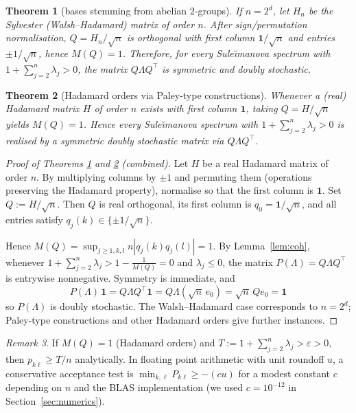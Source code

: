 \documentclass[12pt,fleqn]{amsart}
\renewcommand{\le}{\leqslant}
\renewcommand{\ge}{\geqslant}
\newtheorem{thm}{Theorem}
\theoremstyle{remark}
\newtheorem{rem}[thm]{Remark}
\newcommand{\1}{\mathbf{1}}
\newcommand{\Lam}{\Lambda}
\begin{document}
\begin{thm}[bases stemming from abelian $2$-groups]\label{thm:hypercube}
If $n=2^d$, let $H_n$ be the Sylvester (Walsh--Hadamard) matrix of order $n$. After sign/permutation normalisation, $Q=H_n/\sqrt n$ is orthogonal with first column $\1/\sqrt n$ and entries $\pm 1/\sqrt n$, hence $M(Q)=1$. Therefore, for \emph{every} Sule\u{\i}manova spectrum with $1+\sum_{j=2}^n\lambda_j>0$, the matrix $Q\Lam Q^\top$ is symmetric and doubly stochastic.
\end{thm}

\begin{thm}[Hadamard orders via Paley-type constructions]\label{thm:hadamard}
Whenever a (real) Hadamard matrix $H$ of order $n$ exists with first column $\1$, taking $Q=H/\sqrt n$ yields $M(Q)=1$. Hence every Sule\u{\i}manova spectrum with $1+\sum_{j=2}^n\lambda_j>0$ is realised by a symmetric doubly stochastic matrix via $Q\Lam Q^\top$.
\end{thm}

\begin{proof}[Proof of Theorems \ref{thm:hypercube} and \ref{thm:hadamard} (combined)]
Let $H$ be a real Hadamard matrix of order $n$. By multiplying columns by $\pm1$ and permuting them (operations preserving the Hadamard property), normalise so that the first column is $\1$. Set $Q:=H/\sqrt n$. Then $Q$ is real orthogonal, its first column is $q_0=\1/\sqrt n$, and all entries satisfy $q_j(k)\in\{\pm 1/\sqrt n\}$.

Hence $M(Q)=\sup_{j\ge1,k,l}n|q_j(k)q_j(l)|=1$. By Lemma~\ref{lem:coh}, whenever $1+\sum_{j=2}^n\lambda_j>1-\tfrac1{M(Q)}=0$ and $\lambda_j\le 0$, the matrix $P(\Lambda)=Q\Lambda Q^\top$ is entrywise nonnegative. Symmetry is immediate, and
\[
P(\Lambda)\,\1=Q\Lambda Q^\top\1=Q\Lambda(\sqrt n\,e_0)=\sqrt n\,Qe_0=\1
\]
so $P(\Lambda)$ is doubly stochastic. The Walsh--Hadamard case corresponds to $n=2^d$; Paley-type constructions and other Hadamard orders give further instances.
\end{proof}

\begin{rem}If $M(Q)=1$ (Hadamard orders) and $T:=1+\sum_{j=2}^n\lambda_j>\varepsilon>0$, then
$p_{k\ell}\ge T/n$ analytically. In floating point arithmetic with unit roundoff $u$,
a conservative acceptance test is $\min_{k,\ell}P_{k\ell}\ge -(cu)$ for a modest constant $c$
depending on $n$ and the BLAS implementation (we used $c=10^{-12}$ in Section~\ref{sec:numerics}).
\end{rem}
\end{document}
